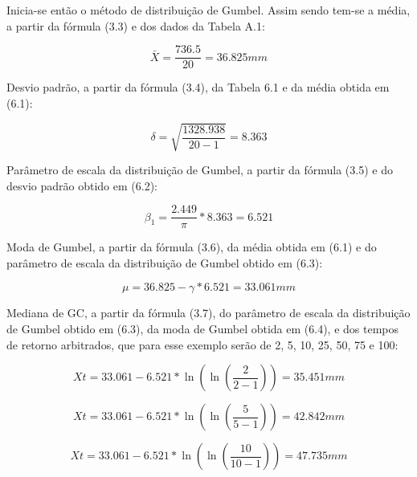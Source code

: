 Inicia-se então o método de distribuição de Gumbel. Assim sendo tem-se a média, a partir da fórmula (3.3) e dos dados da Tabela A.1:\bigskip

\begin{equation}
\bar{X} = \frac{736.5}{20} = 36.825 mm
\end{equation}\bigskip

\newpage
 
Desvio padrão, a partir da fórmula (3.4), da Tabela 6.1 e da média obtida em (6.1):\bigskip

\begin{equation}
\delta = \sqrt{\frac{1328.938}{20 - 1}} = 8.363
\end{equation}\bigskip

Parâmetro de escala da distribuição de Gumbel, a partir da fórmula (3.5) e do desvio padrão obtido em (6.2):\bigskip

\begin{equation}
\beta_1 = \frac{2.449}{\pi} * 8.363 = 6.521
\end{equation}\bigskip

Moda de Gumbel, a partir da fórmula (3.6), da média obtida em (6.1) e do parâmetro de escala da distribuição de Gumbel obtido em (6.3):\bigskip

\begin{equation}
\mu = 36.825 - \gamma * 6.521 = 33.061 mm
\end{equation}\bigskip

Mediana de GC, a partir da fórmula (3.7), do parâmetro de escala da distribuição de Gumbel obtido em (6.3), da moda de Gumbel obtida em (6.4), e dos tempos de retorno arbitrados, que para esse exemplo serão de 2, 5, 10, 25, 50, 75 e 100:\bigskip

\begin{equation}
Xt = 33.061 - 6.521 * \ln{\left(\ln{\left(\frac{2}{2 - 1}\right)}\right)} = 35.451 mm
\end{equation}

\begin{equation}
Xt = 33.061 - 6.521 * \ln{\left(\ln{\left(\frac{5}{5 - 1}\right)}\right)} = 42.842 mm
\end{equation}

\begin{equation}
Xt = 33.061 - 6.521 * \ln{\left(\ln{\left(\frac{10}{10 - 1}\right)}\right)} = 47.735 mm
\end{equation}

